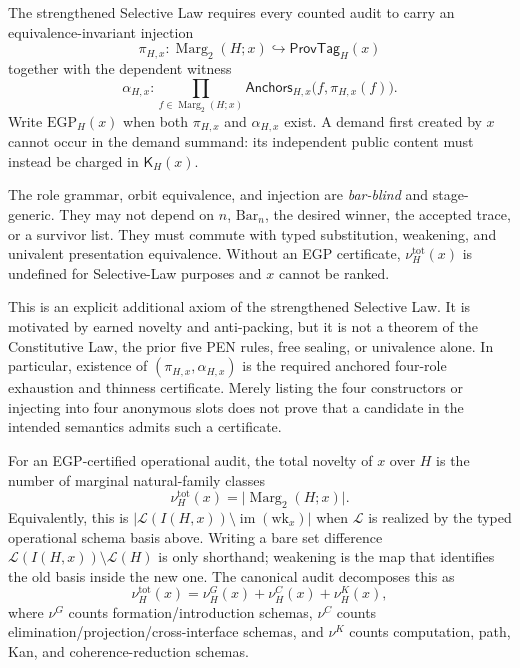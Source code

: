 \begin{definition}
The strengthened Selective Law requires every counted audit to carry an
equivalence-invariant injection
\[
  \pi_{H,x}:\operatorname{Marg}_2(H;x)\hookrightarrow
  \mathsf{ProvTag}_H(x)
  \tag{EGP}
\]
together with the dependent witness
\[
  \alpha_{H,x}:
  \prod_{f\in\operatorname{Marg}_2(H;x)}
  \mathsf{Anchors}_{H,x}\bigl(f,\pi_{H,x}(f)\bigr).
  \tag{Anchor}
\]
Write \(\mathrm{EGP}_H(x)\) when both \(\pi_{H,x}\) and
\(\alpha_{H,x}\) exist. A demand first created by \(x\) cannot occur in the
demand summand: its independent public content must instead be charged in
\(\mathsf K_H(x)\).

The role grammar, orbit equivalence, and injection are \emph{bar-blind} and
stage-generic. They may not depend on \(n\), \(\mathrm{Bar}_n\), the desired
winner, the accepted trace, or a survivor list. They must commute with typed
substitution, weakening, and univalent presentation equivalence. Without an
EGP certificate, \(\nu_H^{\mathrm{tot}}(x)\) is undefined for Selective-Law
purposes and \(x\) cannot be ranked.

This is an explicit additional axiom of the strengthened Selective Law. It is
motivated by earned novelty and anti-packing, but it is not a theorem of the
Constitutive Law, the prior five PEN rules, free sealing, or univalence alone.
In particular, existence of \((\pi_{H,x},\alpha_{H,x})\) is the required
anchored four-role exhaustion and thinness certificate. Merely listing the four
constructors or injecting into four anonymous slots does not prove that a
candidate in the intended semantics admits such a certificate.
\end{definition}

\begin{definition}
For an EGP-certified operational audit, the total novelty of \(x\) over \(H\)
is the number of marginal natural-family classes
\[
\nu^{\mathrm{tot}}_H(x)
=
\bigl|\operatorname{Marg}_2(H;x)\bigr|.
\]
Equivalently, this is
\(\bigl|\mathcal{L}(I(H,x))\setminus\operatorname{im}(\mathrm{wk}_x)\bigr|\)
when \(\mathcal L\) is realized by the typed operational schema basis above.
Writing a bare set difference \(\mathcal L(I(H,x))\setminus\mathcal L(H)\) is
only shorthand; weakening is the map that identifies the old basis inside the
new one.
The canonical audit decomposes this as
\[
\nu^{\mathrm{tot}}_H(x)
=
\nu^G_H(x)+\nu^C_H(x)+\nu^K_H(x),
\]
where \(\nu^G\) counts formation/introduction schemas, \(\nu^C\) counts
elimination/projection/cross-interface schemas, and \(\nu^K\) counts
computation, path, Kan, and coherence-reduction schemas.
\end{definition}

